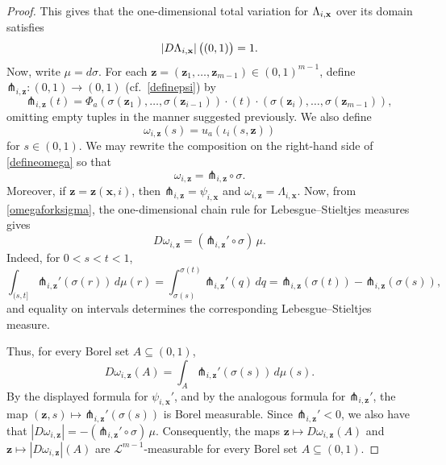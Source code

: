 \documentclass[10pt,a4paper]{amsart}
\newcommand{\pfork}{\mathord{\pitchfork}}
\begin{document}
\begin{proof}
 This gives that the one-dimensional total variation for $\Lambda_{i, \text{{\bf x}}}$ over its domain
 satisfies
\begin{equation}\label{onedimensional}
 \left| D\Lambda_{i, \text{{\bf x}}} \right|\big( (0, 1) \big) = 1. 
\end{equation}
 Now, write \(\mu=d\sigma\). For each
\(\mathbf z=(\mathbf z_1,\ldots,\mathbf z_{m-1})\in(0,1)^{m-1}\), define
$
\pfork_{i,\mathbf z}\colon(0,1)\to(0,1)
$ (cf.\ \eqref{definepsi})
by
$$
\pfork_{i,\mathbf z}(t)
=
\Phi_a\left(
\sigma(\mathbf z_1),\ldots,\sigma(\mathbf z_{i-1}) \right) \cdot \left( 
t\right) \cdot \left( 
\sigma(\mathbf z_i),\ldots,\sigma(\mathbf z_{m-1})
\right),
$$
   omitting empty tuples in the manner suggested previously. 
 We also define 
\begin{equation}\label{defineomega}
\omega_{i,\mathbf z}(s)
=
u_a(\iota_i(s,\mathbf z)) 
\end{equation}
 for $s\in(0,1)$. We may rewrite the composition on the right-hand side of \eqref{defineomega} so that 
\begin{equation}\label{omegaforksigma}
\omega_{i,\mathbf z}
=
\pfork_{i,\mathbf z}\circ\sigma.
\end{equation}
 Moreover, if \(\mathbf z=\mathbf z(\mathbf x,i)\), then
$
\pfork_{i,\mathbf z}=\psi_{i,\mathbf x}$ and $ \omega_{i,\mathbf z}=\Lambda_{i,\mathbf x}$. 
 Now, from \eqref{omegaforksigma}, 
the one-dimensional chain rule for Lebesgue--Stieltjes measures gives
\begin{equation}\label{Domega-chain}
D\omega_{i,\mathbf z}
=
(\pfork_{i,\mathbf z}'\circ\sigma)\,\mu .
\end{equation}
 Indeed, for \(0<s<t<1\),
\[
\int_{(s,t]} \pfork_{i,\mathbf z}'(\sigma(r))\,d\mu(r)
=
\int_{\sigma(s)}^{\sigma(t)}\pfork_{i,\mathbf z}'(q)\,dq
=
\pfork_{i,\mathbf z}(\sigma(t))-\pfork_{i,\mathbf z}(\sigma(s)),
\]
and equality on intervals determines the corresponding Lebesgue--Stieltjes
measure.

Thus, for every Borel set \(A\subseteq(0,1)\),
\[
D\omega_{i,\mathbf z}(A)
=
\int_A \pfork_{i,\mathbf z}'(\sigma(s))\,d\mu(s).
\]
By the displayed formula for \(\psi_{i,\mathbf x}'\), and by the analogous
formula for \(\pfork_{i,\mathbf z}'\), the map
$
(\mathbf z,s)\mapsto \pfork_{i,\mathbf z}'(\sigma(s))
$
is Borel measurable.
 Since \(\pfork_{i,\mathbf z}'<0\), we also have that 
$
|D\omega_{i,\mathbf z}|
=
-(\pfork_{i,\mathbf z}'\circ\sigma)\,\mu$.
 Consequently, the maps
$
\mathbf z\mapsto D\omega_{i,\mathbf z}(A)$ and $
\mathbf z\mapsto |D\omega_{i,\mathbf z}|(A)$
 are \(\mathcal L^{m-1}\)-measurable for every Borel set
\(A\subseteq(0,1)\).


\end{proof}
\end{document}
